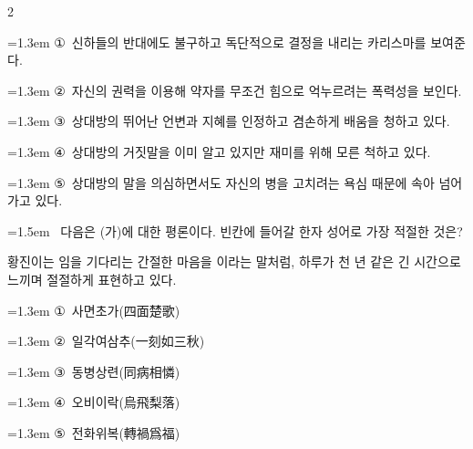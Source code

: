 \documentclass[10pt, a4paper]{article}
\begin{document}
\begin{multicols}{2}
\begin{minipage}{\columnwidth}
\vspace{0.5mm}
{\hangindent=1.3em  \noindent\hspace{0.3em}①~신하들의 반대에도 불구하고 독단적으로 결정을 내리는 카리스마를 보여준다.\par}
{\hangindent=1.3em  \noindent\hspace{0.3em}②~자신의 권력을 이용해 약자를 무조건 힘으로 억누르려는 폭력성을 보인다.\par}
{\hangindent=1.3em  \noindent\hspace{0.3em}③~상대방의 뛰어난 언변과 지혜를 인정하고 겸손하게 배움을 청하고 있다.\par}
{\hangindent=1.3em  \noindent\hspace{0.3em}④~상대방의 거짓말을 이미 알고 있지만 재미를 위해 모른 척하고 있다.\par}
{\hangindent=1.3em  \noindent\hspace{0.3em}⑤~상대방의 말을 의심하면서도 자신의 병을 고치려는 욕심 때문에 속아 넘어가고 있다.\par}
\vspace{4mm}
\end{minipage}
\par

\noindent\begin{minipage}{\columnwidth}
\vspace{2mm}
{\hangindent=1.5em  ~다음은 (가)에 대한 평론이다. 빈칸에 들어갈 한자 성어로 가장 적절한 것은?\par}

\vspace{1mm}
\begin{boxibox}
황진이는 임을 기다리는 간절한 마음을 \underline{\hspace{3cm}}이라는 말처럼, 하루가 천 년 같은 긴 시간으로 느끼며 절절하게 표현하고 있다. \\
\end{boxibox}
\vspace{1mm}

\vspace{0.5mm}
{\hangindent=1.3em  \noindent\hspace{0.3em}①~사면초가(四面楚歌)\par}
{\hangindent=1.3em  \noindent\hspace{0.3em}②~일각여삼추(一刻如三秋)\par}
{\hangindent=1.3em  \noindent\hspace{0.3em}③~동병상련(同病相憐)\par}
{\hangindent=1.3em  \noindent\hspace{0.3em}④~오비이락(烏飛梨落)\par}
{\hangindent=1.3em  \noindent\hspace{0.3em}⑤~전화위복(轉禍爲福)\par}
\vspace{4mm}
\end{minipage}
\par


\end{multicols}
\end{document}

